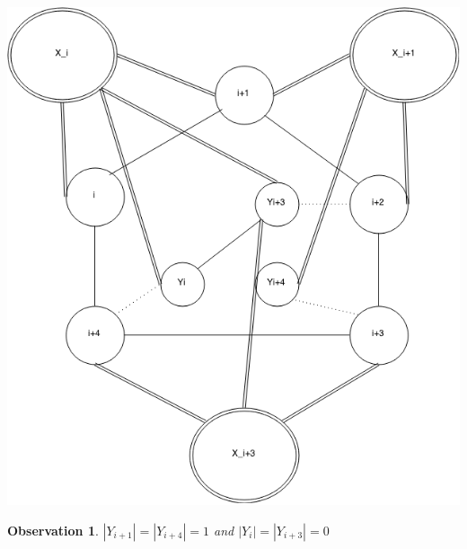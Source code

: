 \documentclass[12pt]{article}
\newtheorem{Observation}[Theorem]{Observation}
\begin{document}
\begin{minipage}{0.5\textwidth}\raggedleft
	\includegraphics[width=\linewidth]{Yi-Yi3-Yi4.png}
\end{minipage}
\clearpage


\begin{Observation}\label{obs:yi1-yi4} 
$|Y_{i+1}| = |Y_{i+4}| = 1$ and $|Y_{i}| = |Y_{i+3}| = 0$
\end{Observation}
\end{document}
